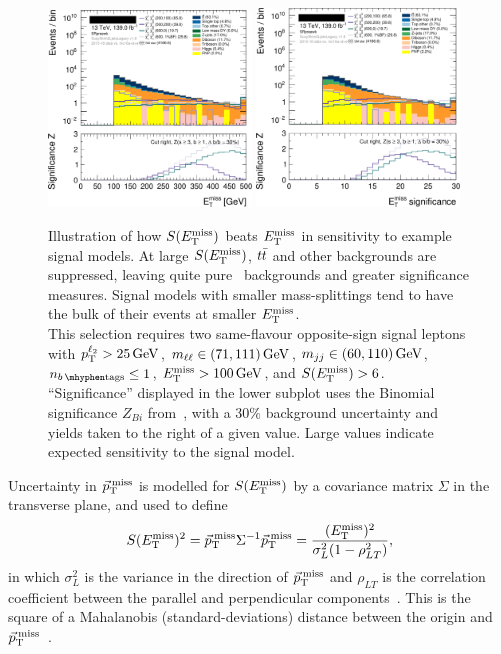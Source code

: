 \begin{figure}[tp]
\centering
\includegraphics[width=0.48\textwidth]{figures/2ljets_presel_met_logy.png}
\hfill
\includegraphics[width=0.48\textwidth]{figures/2ljets_presel_met_sig_logy.png}
\caption[
Illustration of how $\metsig$ beats $\met$ in sensitivity to example signal
models
]{
Illustration of how $\metsig$ beats $\met$ in sensitivity to example signal
models.
At large $\metsig$, $\ttbar$ and other backgrounds are suppressed, leaving
quite pure \diboson\ backgrounds and greater significance measures.
Signal models with smaller mass-splittings tend to have the bulk of their
events at smaller $\met$.
\\[0.5em]
This selection requires two same-flavour opposite-sign signal leptons with
$\pt^{\ell_2} > 25\,\eV[G]$,
$\mll \in (71, 111)\,\eV[G]$,
$\mjj \in (60, 110)\,\eV[G]$,
$\nbtag \leq 1$,
$\met > 100\,\eV[G]$, and
$\metsig > 6$.
\\[0.5em]
``Significance'' displayed in the lower subplot uses the Binomial significance
$Z_{Bi}$ from~\cite{cousins2008evaluation}, with a $30\%$ background
uncertainty and yields taken to the right of a given value.
Large values indicate expected sensitivity to the signal model.
}
\label{fig:2ljets_presel_met}
\end{figure}

Uncertainty in $\ptmiss$ is modelled for $\metsig$ by a covariance matrix
$\Sigma$ in the transverse plane, and used to define
\begin{equation}
\metsig^2
=
\ptmiss \Sigma^{-1} \ptmiss
=
\frac{(\met)^2}{\sigma_L^2(1 - \rho_{LT}^2)}
,
\end{equation}
in which $\sigma_L^2$ is the variance in the direction of $\ptmiss$ and
$\rho_{LT}$ is the correlation coefficient between the parallel and
perpendicular components~\cite{atlas_met_significance}.
This is the square of a Mahalanobis (standard-deviations) distance between
the origin and $\ptmiss$~\cite{mahalanobis1936generalised}.

